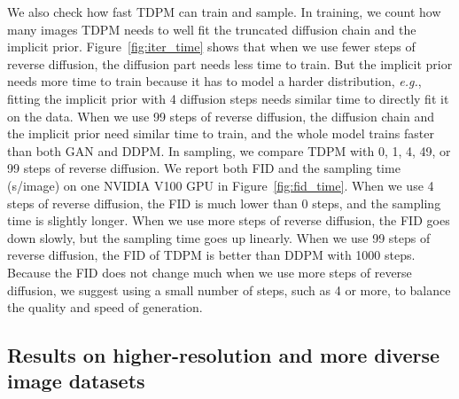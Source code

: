 \documentclass{article} \usepackage{iclr2023_conference,times}
\def\Figref#1{Figure~\ref{#1}}
\theoremstyle{plain}
\theoremstyle{definition}
\theoremstyle{remark}
\begin{document}
{We also check how fast TDPM can train and sample. In training, we count how many images TDPM needs to well fit the truncated diffusion chain and the implicit prior. \Figref{fig:iter_time} shows that when we use fewer steps of reverse diffusion, the diffusion part needs less time to train. But the implicit prior needs more time to train because it has to model a harder distribution, \textit{e.g.}, fitting the implicit prior with 4 diffusion steps needs similar time to directly fit it on the data. When we use 99 steps of reverse diffusion, the diffusion chain and the implicit prior need similar time to train, and the whole model trains faster than both GAN and DDPM. 
In sampling, we compare TDPM with 0, 1, 4, 49, or 99 steps of reverse diffusion. We report both FID and the sampling time (s/image) on one NVIDIA V100 GPU in \Figref{fig:fid_time}. When we use 4 steps of reverse diffusion, the FID is much lower than 0 steps, and the sampling time is slightly longer. When we use more steps of reverse diffusion, the FID goes down slowly, but the sampling time goes up linearly. When we use 99 steps of reverse diffusion, the FID of TDPM is better than DDPM with 1000 steps. Because the FID does not change much when we use more steps of reverse diffusion, we suggest using a small number of steps, such as 4 or more, to balance the quality and speed of generation.

      


\subsection{Results on higher-resolution and more diverse image datasets}



}
\end{document}
